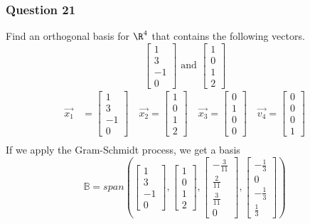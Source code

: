 \documentclass{math}
\begin{document}
\subsubsection*{Question 21}
Find an orthogonal basis for \( \R^4 \) that contains the following vectors.
\[ \begin{bmatrix}1 \\ 3 \\ -1 \\ 0\end{bmatrix} \text{ and }
  \begin{bmatrix}1 \\ 0 \\ 1 \\ 2\end{bmatrix} \]
\begin{align*}
  \vec{x_1} &= \begin{bmatrix}1 \\ 3 \\ -1 \\ 0\end{bmatrix} \quad
    \vec{x_2} = \begin{bmatrix}1 \\ 0 \\ 1 \\ 2\end{bmatrix} \quad
    \vec{x_3} = \begin{bmatrix}0 \\ 1 \\ 0 \\ 0\end{bmatrix} \quad
    \vec{v_4} = \begin{bmatrix}0 \\ 0 \\ 0 \\ 1\end{bmatrix} \\
\end{align*}
If we apply the Gram-Schmidt process, we get a basis
\[ \mathbb{B} = span\left(
  \begin{bmatrix}1 \\ 3 \\ -1 \\ 0\end{bmatrix},
  \begin{bmatrix}1 \\ 0 \\ 1 \\ 2\end{bmatrix},
  \begin{bmatrix}-\frac{3}{11} \\ \frac{2}{11} \\ \frac{3}{11} \\
    0\end{bmatrix},
  \begin{bmatrix}-\frac{1}{3} \\ 0 \\ -\frac{1}{3} \\ \frac{1}{3}\end{bmatrix}
\right) \]
\end{document}
